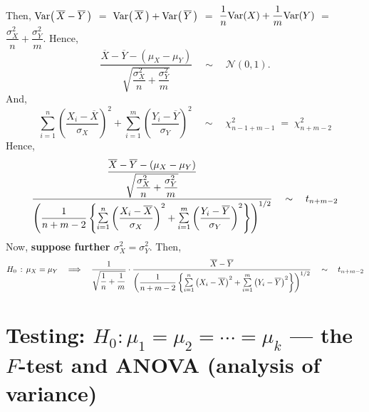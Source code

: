 \documentclass{article}
\begin{document}
Then, $\textnormal{Var}\!\left(\,\overline{X}-\overline{Y}\,\right)$
$=$ $\textnormal{Var}\!\left(\,\overline{X}\,\right) + \textnormal{Var}\!\left(\,\overline{Y}\,\right)$
$=$ $\dfrac{1}{n}\textnormal{Var}\!\left(X\right) + \dfrac{1}{m}\textnormal{Var}\!\left(Y\right)$
$=$ $\dfrac{\sigma^{2}_{X}}{n} + \dfrac{\sigma^{2}_{Y}}{m}$.  Hence,
\begin{equation*}
\dfrac{\overline{X}-\overline{Y} - \left(\mu_{X}-\mu_{Y}\right)}{\sqrt{\dfrac{\sigma^{2}_{X}}{n} + \dfrac{\sigma^{2}_{Y}}{m}}}
\quad\sim\quad\mathcal{N}(0,1).
\end{equation*}
And,
\begin{equation*}
  \sum^{n}_{i=1}\left(\dfrac{X_{i}-\overline{X}}{\sigma_{X}}\right)^{2}
+\sum^{m}_{i=1}\left(\dfrac{Y_{i}-\overline{Y}}{\sigma_{Y}}\right)^{2}
\quad\sim\quad
\chi^{2}_{n-1+m-1} \; = \; \chi^{2}_{n+m-2} 
\end{equation*}
Hence,
\begin{equation*}
\dfrac{
\dfrac{\overline{X}-\overline{Y} - \left(\mu_{X}-\mu_{Y}\right)}{\sqrt{\dfrac{\sigma^{2}_{X}}{n} + \dfrac{\sigma^{2}_{Y}}{m}}}
}
{
\left(
\dfrac{1}{n+m-2}
\left\{
  \underset{i=1}{\overset{n}{\textnormal{\large$\sum$}}}\left(\dfrac{X_{i}-\overline{X}}{\sigma_{X}}\right)^{2}
+\underset{i=1}{\overset{m}{\textnormal{\large$\sum$}}}\left(\dfrac{Y_{i}-\overline{Y}}{\sigma_{Y}}\right)^{2}
\right\}
\right)^{1/2}
}
\quad\sim\quad t_{n+m-2} 
\end{equation*}
Now, \textbf{\large suppose further $\sigma^{2}_{X} = \sigma^{2}_{Y}$}.  Then,
\begin{equation*}
H_{0} \,:\, \mu_{X} = \mu_{Y}
\quad\Longrightarrow\quad
\dfrac{1}{\sqrt{\dfrac{1}{n} + \dfrac{1}{m}}} \cdot
\dfrac{
\overline{X}-\overline{Y}
}
{
\left(
\dfrac{1}{n+m-2}
\left\{
  \underset{i=1}{\overset{n}{\textnormal{\large$\sum$}}}\left(X_{i}-\overline{X}\right)^{2}
+\underset{i=1}{\overset{m}{\textnormal{\large$\sum$}}}\left(Y_{i}-\overline{Y}\right)^{2}
\right\}
\right)^{1/2}
}
\quad\sim\quad t_{n+m-2} 
\end{equation*}


\section{Testing: $H_{0} : \mu_{1} = \mu_{2} = \cdots = \mu_{k}$ --- the $F$-test and ANOVA (analysis of variance)}
\setcounter{theorem}{0}
\end{document}
